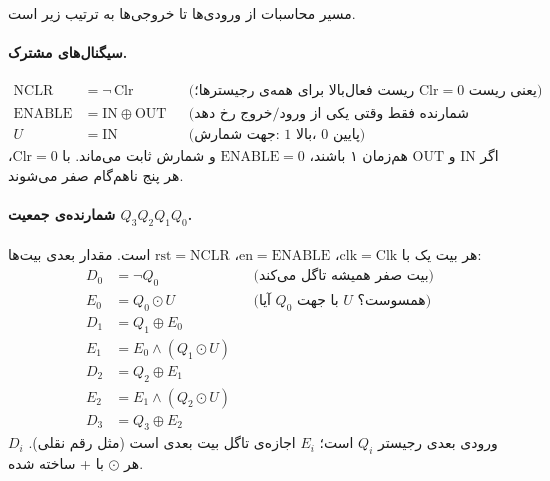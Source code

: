 \documentclass[10pt,a4paper]{article}
\begin{document}
مسیر محاسبات از ورودی‌ها تا خروجی‌ها به ترتیب زیر است.

\paragraph*{سیگنال‌های مشترک.}
\[
\begin{aligned}
\mathrm{NCLR} &= \lnot\,\mathrm{Clr}
&&\text{(ریست فعال‌بالا برای همه‌ی رجیسترها؛ $\mathrm{Clr}{=}0$ یعنی ریست)}\\
\mathrm{ENABLE} &= \mathrm{IN} \oplus \mathrm{OUT}
&&\text{(شمارنده فقط وقتی یکی از ورود/خروج رخ دهد آپدیت شود)}\\
U &= \mathrm{IN}
&&\text{(جهت شمارش: $1$ بالا، $0$ پایین)}
\end{aligned}
\]
اگر $\mathrm{IN}$ و $\mathrm{OUT}$ هم‌زمان ۱ باشند، $\mathrm{ENABLE}=0$ و شمارش ثابت می‌ماند. با $\mathrm{Clr}=0$، هر پنج  ناهم‌گام صفر می‌شوند.

\paragraph*{شمارنده‌ی جمعیت $Q_3Q_2Q_1Q_0$.}
هر بیت یک  با $\mathrm{clk}=\mathrm{Clk}$، $\mathrm{en}=\mathrm{ENABLE}$، $\mathrm{rst}=\mathrm{NCLR}$ است. مقدار بعدی بیت‌ها:
\[
\begin{aligned}
D_0 &= \lnot Q_0 &&\text{(بیت صفر همیشه تاگل می‌کند)}\\
E_0 &= Q_0 \odot U &&\text{(آیا $Q_0$ با جهت $U$ همسوست؟)}\\
D_1 &= Q_1 \oplus E_0\\
E_1 &= E_0 \land (Q_1 \odot U)\\
D_2 &= Q_2 \oplus E_1\\
E_2 &= E_1 \land (Q_2 \odot U)\\
D_3 &= Q_3 \oplus E_2
\end{aligned}
\]
$D_i$ ورودی بعدی رجیستر $Q_i$ است؛ $E_i$ اجازه‌ی تاگل بیت بعدی است (مثل رقم نقلی). هر $\odot$ با + ساخته شده.
\end{document}
